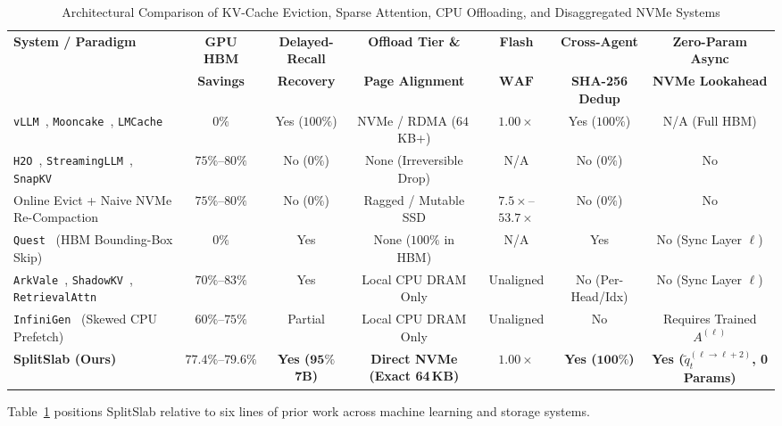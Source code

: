 \documentclass[10pt,journal,compsoc]{IEEEtran}
\theoremstyle{definition}
\theoremstyle{remark}
\newcommand{\SplitSlab}{\textup{\textsc{SplitSlab}}}
\newcommand{\WAF}{\operatorname{WAF}}
\def\SplitSlab{SplitSlab}%
\begin{document}
\begin{table}[!t]
\centering
\caption{Architectural Comparison of KV-Cache Eviction, Sparse Attention, CPU Offloading, and Disaggregated NVMe Systems}
\label{tab:prior_art}
\renewcommand{\arraystretch}{1.12}
\setlength{\tabcolsep}{4.8pt}
\begin{tabular}{@{}lcccccc@{}}
\toprule
\textbf{System / Paradigm} & \textbf{GPU HBM} & \textbf{Delayed-Recall} & \textbf{Offload Tier \&} & \textbf{Flash} & \textbf{Cross-Agent} & \textbf{Zero-Param Async} \\
 & \textbf{Savings} & \textbf{Recovery} & \textbf{Page Alignment} & $\mathbf{\WAF}$ & \textbf{SHA-256 Dedup} & \textbf{NVMe Lookahead} \\
\midrule
\texttt{vLLM}~\cite{kwon2023vllm}, \texttt{Mooncake}~\cite{qin2025mooncake}, \texttt{LMCache}~\cite{cheng2025lmcache} & $0\%$ & Yes ($100\%$) & NVMe / RDMA ($64$\,KB+) & $1.00\times$ & Yes ($100\%$) & N/A (Full HBM) \\
\texttt{H2O}~\cite{zhang2023h2o}, \texttt{StreamingLLM}~\cite{xiao2024streamingllm}, \texttt{SnapKV}~\cite{li2024snapkv} & $75\%$--$80\%$ & No ($0\%$) & None (Irreversible Drop) & N/A & No ($0\%$) & No \\
Online Evict + Naive NVMe Re-Compaction & $75\%$--$80\%$ & No ($0\%$) & Ragged / Mutable SSD & $7.5\times$--$53.7\times$ & No ($0\%$) & No \\
\texttt{Quest}~\cite{tang2024quest} (HBM Bounding-Box Skip) & $0\%$ & Yes & None ($100\%$ in HBM) & N/A & Yes & No (Sync Layer $\ell$) \\
\texttt{ArkVale}~\cite{chen2024arkvale}, \texttt{ShadowKV}~\cite{sun2025shadowkv}, \texttt{RetrievalAttn}~\cite{liu2024retrievalattention} & $70\%$--$83\%$ & Yes & Local CPU DRAM Only & Unaligned & No (Per-Head/Idx) & No (Sync Layer $\ell$) \\
\texttt{InfiniGen}~\cite{lee2024infinigen} (Skewed CPU Prefetch) & $60\%$--$75\%$ & Partial & Local CPU DRAM Only & Unaligned & No & Requires Trained $A^{(\ell)}$ \\
\midrule
\textbf{\SplitSlab{} (Ours)} & $\mathbf{77.4\%\text{--}79.6\%}$ & \textbf{Yes ($\mathbf{95\%}$ 7B)} & \textbf{Direct NVMe (Exact 64\,KB)} & $\mathbf{1.00\times}$ & \textbf{Yes ($\mathbf{100\%}$)} & \textbf{Yes ($\tilde{q}_t^{(\ell\to\ell+2)}$, 0 Params)} \\
\bottomrule
\end{tabular}
\end{table}

Table~\ref{tab:prior_art} positions \SplitSlab{} relative to six lines of prior work across machine learning and storage systems.
\end{document}
